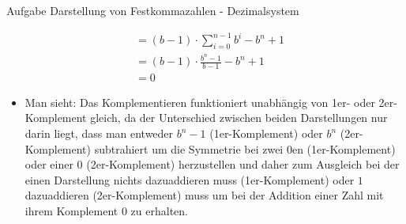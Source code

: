 \begin{frame}[allowframebreaks]{Aufgabe \thesection}{Darstellung von Festkommazahlen - Dezimalsystem}
\begin{solution}
\begin{itemize}
\begin{align*}
            &=(b-1)\cdot\sum_{i=0}^{n-1}b^{i}-b^{n}+1\\
            &=(b-1)\cdot\frac{b^{n}-1}{b-1}-b^{n}+1\\
            &=0
        \end{align*}
    \end{itemize}
  \end{solution}
  \begin{Sidenote}
    \begin{itemize}
        \item Man sieht: Das Komplementieren funktioniert unabhängig von 1er- oder 2er-Komplement gleich, da der Unterschied zwischen beiden Darstellungen nur darin liegt, dass man entweder $b^n-1$ (1er-Komplement) oder $b^n$ (2er-Komplement) subtrahiert um die Symmetrie bei zwei 0en (1er-Komplement) oder einer 0 (2er-Komplement) herzustellen und daher zum Ausgleich bei der einen Darstellung nichts dazuaddieren muss (1er-Komplement) oder $1$ dazuaddieren (2er-Komplement) muss um bei der Addition einer Zahl mit ihrem Komplement $0$ zu erhalten. 
    \end{itemize}
  \end{Sidenote}
\end{frame}